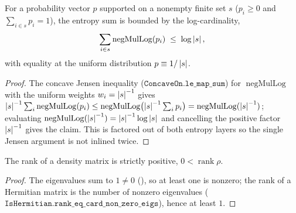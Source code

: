 \begin{lemma}\label{sum_negMulLog_le_log_card}
  \leanok
  For a probability vector \(p\) supported on a nonempty finite set \(s\) (\(p_i\ge 0\) and
  \(\sum_{i\in s}p_i = 1\)), the entropy sum is bounded by the log-cardinality,
  \[
    \sum_{i\in s}\operatorname{negMulLog}(p_i) \;\le\; \log\left\lvert s \right\rvert,
  \]
  with equality at the uniform distribution \(p\equiv 1/\left\lvert s \right\rvert\).
\end{lemma}
\begin{proof}\leanok
  The concave Jensen inequality (\(\texttt{ConcaveOn.le\_map\_sum}\)) for
  \(\operatorname{negMulLog}\) with the uniform weights \(w_i = \left\lvert s \right\rvert^{-1}\) gives
  \(\left\lvert s \right\rvert^{-1}\sum_i\operatorname{negMulLog}(p_i)\le\operatorname{negMulLog}\bigl(\left\lvert s \right\rvert^{-1}\sum_i p_i\bigr) = \operatorname{negMulLog}(\left\lvert s \right\rvert^{-1})\); evaluating
  \(\operatorname{negMulLog}(\left\lvert s \right\rvert^{-1}) = \left\lvert s \right\rvert^{-1}\log\left\lvert s \right\rvert\) and cancelling the positive
  factor \(\left\lvert s \right\rvert^{-1}\) gives the claim. This is factored out of both entropy layers so the single
  Jensen argument is not inlined twice.
\end{proof}

\begin{lemma}\label{DensityMatrix.rank_pos}
  \leanok
  The rank of a density matrix is strictly positive, \(0 < \operatorname{rank}\rho\).
\end{lemma}
\begin{proof}\leanok
  The eigenvalues sum to \(1\ne 0\) (), so at least one
  is nonzero; the rank of a Hermitian matrix is the number of nonzero eigenvalues
  (\(\texttt{IsHermitian.rank\_eq\_card\_non\_zero\_eigs}\)), hence at least \(1\).
\end{proof}


